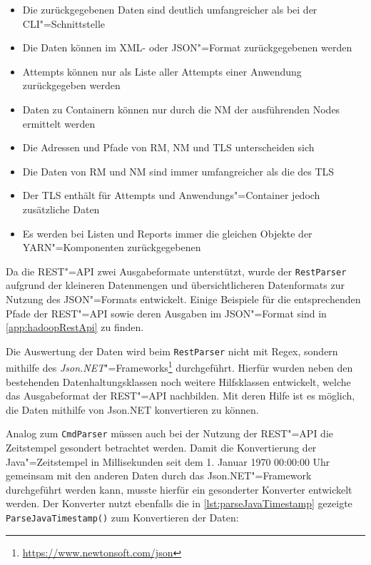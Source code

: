 \begin{itemize}
    \item Die zurückgegebenen Daten sind deutlich umfangreicher als bei der \gls{CLI}"=Schnittstelle
    \item Die Daten können im XML- oder JSON"=Format zurückgegebenen werden
    \item Attempts können nur als Liste aller Attempts einer Anwendung zurückgegeben werden
    \item Daten zu Containern können nur durch die \gls{NM} der ausführenden Nodes ermittelt werden
    \item Die Adressen und Pfade von \gls{RM}, \gls{NM} und \gls{TLS} unterscheiden sich
    \item Die Daten von \gls{RM} und \gls{NM} sind immer umfangreicher als die des \gls{TLS}
    \item Der \gls{TLS} enthält für Attempts und Anwendungs"=Container jedoch zusätzliche Daten
    \item Es werden bei Listen und Reports immer die gleichen Objekte der YARN"=Komponenten zurückgegebenen
\end{itemize}

Da die REST"=API zwei Ausgabeformate unterstützt, wurde der \texttt{RestParser} aufgrund der kleineren Datenmengen und übersichtlicheren Datenformats zur Nutzung des JSON"=Formats entwickelt.
Einige Beispiele für die entsprechenden Pfade der REST"=API sowie deren Ausgaben im JSON"=Format sind in \cref{app:hadoopRestApi} zu finden.

Die Auswertung der Daten wird beim \texttt{RestParser} nicht mit Regex, sondern mithilfe des \emph{Json.NET}"=Frameworks\footnote{\url{https://www.newtonsoft.com/json}} durchgeführt.
Hierfür wurden neben den bestehenden Datenhaltungsklassen noch weitere Hilfsklassen entwickelt, welche das Ausgabeformat der REST"=API nachbilden.
Mit deren Hilfe ist es möglich, die Daten mithilfe von Json.NET konvertieren zu können.

Analog zum \texttt{CmdParser} müssen auch bei der Nutzung der REST"=API die Zeitstempel gesondert betrachtet werden.
Damit die Konvertierung der Java"=Zeitstempel in Millisekunden seit dem 1. Januar 1970 00:00:00 Uhr gemeinsam mit den anderen Daten durch das Json.NET"=Framework durchgeführt werden kann, musste hierfür ein gesonderter Konverter entwickelt werden.
Der Konverter nutzt ebenfalls die in \cref{lst:parseJavaTimestamp} gezeigte \texttt{ParseJavaTimestamp()} zum Konvertieren der Daten:

